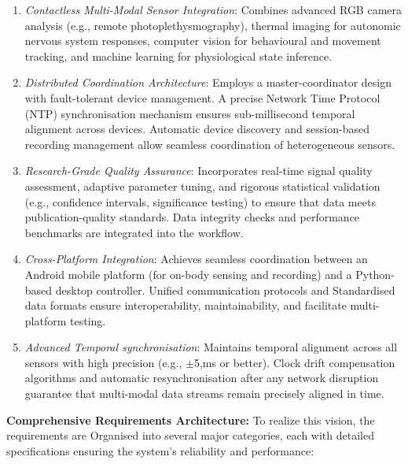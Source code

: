 \documentclass[11pt,a4paper]{report}
\begin{document}
\begin{enumerate}
\item \textit{Contactless Multi-Modal Sensor Integration}: Combines advanced RGB camera analysis (e.g., remote photoplethysmography), thermal imaging for autonomic nervous system responses, computer vision for behavioural and movement tracking, and machine learning for physiological state inference.
\item \textit{Distributed Coordination Architecture}: Employs a master-coordinator design with fault-tolerant device management. A precise Network Time Protocol (NTP) synchronisation mechanism ensures sub-millisecond temporal alignment across devices. Automatic device discovery and session-based recording management allow seamless coordination of heterogeneous sensors.
\item \textit{Research-Grade Quality Assurance}: Incorporates real-time signal quality assessment, adaptive parameter tuning, and rigorous statistical validation (e.g., confidence intervals, significance testing) to ensure that data meets publication-quality standards. Data integrity checks and performance benchmarks are integrated into the workflow.
\item \textit{Cross-Platform Integration}: Achieves seamless coordination between an Android mobile platform (for on-body sensing and recording) and a Python-based desktop controller. Unified communication protocols and Standardised data formats ensure interoperability, maintainability, and facilitate multi-platform testing.
\item \textit{Advanced Temporal synchronisation}: Maintains temporal alignment across all sensors with high precision (e.g., $\pm$5,ms or better). Clock drift compensation algorithms and automatic resynchronisation after any network disruption guarantee that multi-modal data streams remain precisely aligned in time.
\end{enumerate} \textbf{Comprehensive Requirements Architecture:} To realize this vision, the requirements are Organised into several major categories, each with detailed specifications ensuring the system's reliability and performance:
\end{document}
